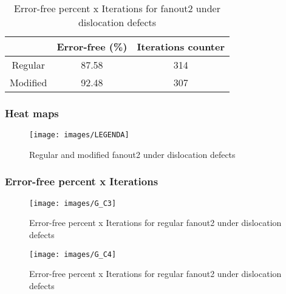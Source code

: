 \begin{table}[h]
\begin{center}
\begin{tabular}{|c|c|c|}
\hline
 & Error-free (\%) & Iterations counter \\
\hline
 Regular & 87.58 & 314 \\
\hline
 Modified & 92.48 & 307 \\
\hline

\end{tabular}
\caption{Error-free percent x Iterations for fanout2 under dislocation defects}
\end{center}
\end{table}

\pagebreak
\subsubsection{Heat maps}

\begin{figure}[h]
\center
{}
\hfill
{}
\linebreak
{\texttt{[image: images/LEGENDA]}
}
\caption{Regular and modified fanout2 under dislocation defects}
\label{figure:fanout2_t2}
\end{figure}

\subsubsection{Error-free percent x Iterations}

\begin{figure}[h!]
\center
\texttt{[image: images/G\_C3]}
\caption{Error-free percent x Iterations for regular fanout2 under dislocation defects}
\label{figure:fanout2_reg_gt2}
\end{figure}

\begin{figure}[h!]
\center
\texttt{[image: images/G\_C4]}
\caption{Error-free percent x Iterations for regular fanout2 under dislocation defects}
\label{figure:fanout2_mod_gt2}
\end{figure}
\pagebreak
